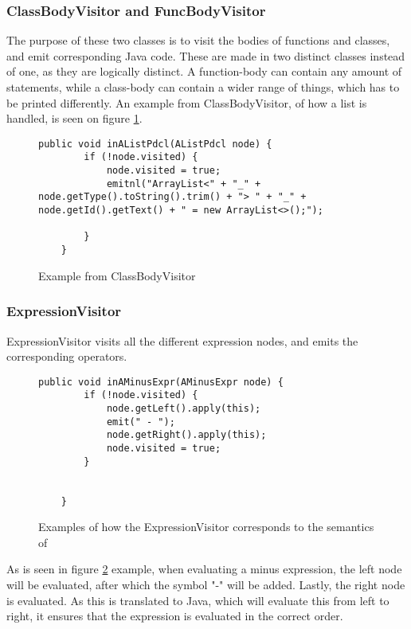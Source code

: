 \subsubsection{ClassBodyVisitor and FuncBodyVisitor}
The purpose of these two classes is to visit the bodies of functions and classes, and emit corresponding Java code. These are made in two distinct classes instead of one, as they are logically distinct. A function-body can contain any amount of statements, while a class-body can contain a wider range of things, which has to be printed differently. An example from ClassBodyVisitor, of how a list is handled, is seen on figure \ref{fig:inAListPdcl}.

\begin{figure}[H]
    \centering
    \begin{lstlisting}[style=gglang]
     public void inAListPdcl(AListPdcl node) {
        if (!node.visited) {
            node.visited = true;
            emitnl("ArrayList<" + "_" + node.getType().toString().trim() + "> " + "_" + node.getId().getText() + " = new ArrayList<>();");

        }
    }
    \end{lstlisting}
    \caption{Example from ClassBodyVisitor}\label{fig:inAListPdcl}
\end{figure}


\subsubsection{ExpressionVisitor}
ExpressionVisitor visits all the different expression nodes, and emits the corresponding operators.

\begin{figure}[H]
    \centering
    \begin{lstlisting}[style=gglang]
    public void inAMinusExpr(AMinusExpr node) {
        if (!node.visited) {
            node.getLeft().apply(this);
            emit(" - ");
            node.getRight().apply(this);
            node.visited = true;
        }


    }
    \end{lstlisting}
    \caption{Examples of how the ExpressionVisitor corresponds to the semantics of \lang{}}\label{fig:inAMinusExpr}
\end{figure}

As is seen in figure \ref{fig:inAMinusExpr} example, when evaluating a minus expression, the left node will be evaluated, after which the symbol "-" will be added. Lastly, the right node is evaluated. As this is translated to Java, which will evaluate this from left to right, it ensures that the expression is evaluated in the correct order. 

